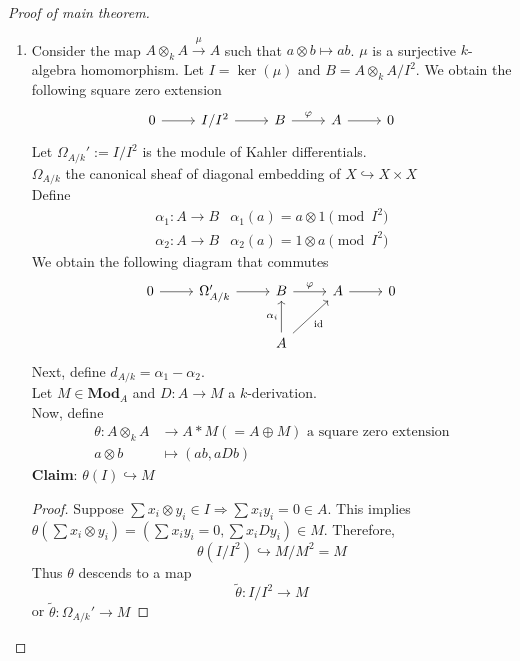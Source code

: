 \documentclass[oneside, 12pt, ]{scrbook}
\theoremstyle{theorem}
\begin{document}
\begin{proof}[Proof of main theorem]
\begin{enumerate}
\item Consider the map $A\otimes_{k} A \xrightarrow{\mu} A$ such that $a \otimes b \mapsto ab$. $\mu$ is a surjective $k$-algebra homomorphism. Let $I = \ker(\mu)$ and $B = A \otimes_{k} A/I^2$. We obtain the following square zero extension
\[\begin{tikzcd}
	0 & {I/I^2} & B & A & 0
	\arrow[from=1-1, to=1-2]
	\arrow[from=1-2, to=1-3]
	\arrow["\varphi", from=1-3, to=1-4]
	\arrow[from=1-4, to=1-5]
\end{tikzcd}\]
Let $\Omega_{A/k}' := I/I^2$ is the module of Kahler differentials. \\
$\Omega_{A/k}$ the canonical sheaf of diagonal embedding of $X \hookrightarrow X \times X$\\
Define 
\begin{align*}
\alpha_{1}: A \rightarrow B & \alpha_{1}(a) = a\otimes 1 \pmod{I^2} \\
\alpha_{2}: A \rightarrow B & \alpha_{2}(a) = 1\otimes a \pmod{I^2}
\end{align*}
We obtain the following diagram that commutes
\[\begin{tikzcd}
	0 & {\Omega_{A/k}'} & B & A & 0 \\
	&& A
	\arrow[from=1-1, to=1-2]
	\arrow[from=1-2, to=1-3]
	\arrow["\varphi", from=1-3, to=1-4]
	\arrow[from=1-4, to=1-5]
	\arrow["{\alpha_{i}}", from=2-3, to=1-3]
	\arrow["{\mathrm{id}}"', from=2-3, to=1-4]
\end{tikzcd}\]
Next, define $d_{A/k} = \alpha_{1} - \alpha_{2}$.\\
Let $M \in \mathbf{Mod}_{A}$ and $D: A \rightarrow M$ a $k$-derivation. \\
Now, define
\begin{align*}
\theta: A \otimes_{k} A &\rightarrow A *M (= A \oplus M) \text{ a square zero extension}\\
a\otimes b &\mapsto (ab, aDb)
\end{align*}
\textbf{Claim}:  $\theta(I) \hookrightarrow M$
\begin{proof}
Suppose $\sum x_{i} \otimes y_{i} \in I \Rightarrow \sum x_{i}y_{i} = 0 \in A$. This implies $\theta(\sum x_{i}\otimes y_{i}) = (\sum x_{i}y_{i}=0 , \sum x_{i} Dy_{i}) \in M$. Therefore, $$\theta (I/I^2) \hookrightarrow M/M^2 = M$$
Thus $\theta$ descends to a map $$\tilde{\theta} : I/I^2 \rightarrow M$$ or $\tilde{\theta} : \Omega_{A/k}' \rightarrow M$
\end{proof}

\end{enumerate}
\end{proof}
\end{document}
